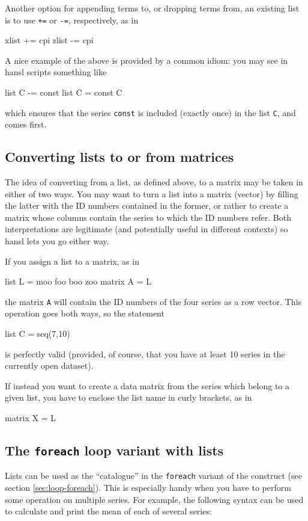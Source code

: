 Another option for appending terms to, or dropping terms from, an
existing list is to use \texttt{+=} or \texttt{-=}, respectively, as
in
\begin{code}
xlist += cpi
zlist -= cpi
\end{code}
A nice example of the above is provided by a common idiom: you may
see in hansl scripts something like
\begin{code}
  list C -= const
  list C = const C
\end{code}
which ensures that the series \texttt{const} is included (exactly
once) in the list \texttt{C}, and comes first.

\subsection{Converting lists to or from matrices}

The idea of converting from a list, as defined above, to a matrix may
be taken in either of two ways. You may want to turn a list into a
matrix (vector) by filling the latter with the ID numbers contained in
the former, or rather to create a matrix whose columns contain the
series to which the ID numbers refer. Both interpretations are
legitimate (and potentially useful in different contexts) so hansl
lets you go either way.

If you assign a list to a matrix, as in
\begin{code}
  list L = moo foo boo zoo
  matrix A = L
\end{code}
the matrix \texttt{A} will contain the ID numbers of the four series
as a row vector. This operation goes both ways, so the statement
\begin{code}
  list C = seq(7,10)
\end{code}
is perfectly valid (provided, of course, that you have at least 10
series in the currently open dataset).

If instead you want to create a data matrix from the series which
belong to a given list, you have to enclose the list name in curly
brackets, as in
\begin{code}
  matrix X = {L}
\end{code}

\subsection{The \texttt{foreach} loop variant with lists}

Lists can be used as the ``catalogue'' in the \texttt{foreach} variant
of the  construct (see section \ref{sec:loop-foreach}). This
is especially handy when you have to perform some operation on
multiple series. For example, the following syntax can be used to
calculate and print the mean of each of several series:

